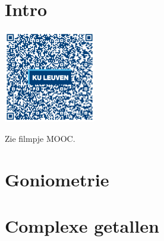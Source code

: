 
\section*{Intro}

\begin{minipage}{.25\linewidth}
	\raggedright
	\includegraphics[width=4cm]{3_gonio_complexe_getallen/inputs/QR_Code_INTRO_module3new}
\end{minipage}
\begin{minipage}{.7\linewidth}
	Zie filmpje MOOC.
\end{minipage}

\section{Goniometrie}



\section{Complexe getallen}

